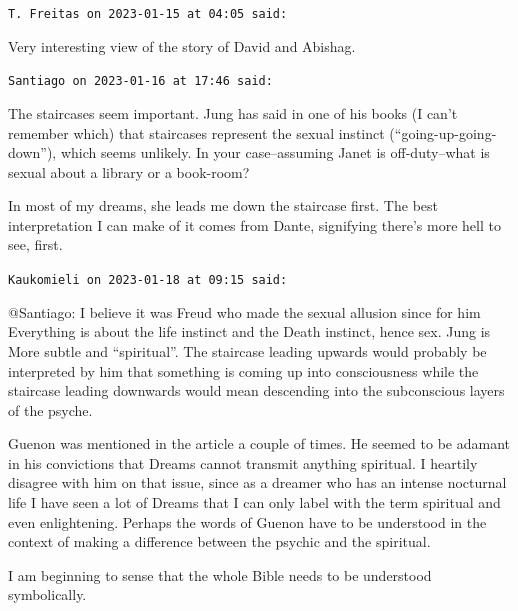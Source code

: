 \begin{footnotesize}
\begin{sffamily}
\texttt{T. Freitas on 2023-01-15 at 04:05 said:}

Very interesting view of the story of David and Abishag.

\hfill

\texttt{Santiago on 2023-01-16 at 17:46 said:}

The staircases seem important. Jung has said in one of his books (I can't remember which) that staircases represent the sexual instinct (``going-up-going-down''), which seems unlikely. In your case--assuming Janet is off-duty--what is sexual about a library or a book-room?

In most of my dreams, she leads me down the staircase first. The best interpretation I can make of it comes from Dante, signifying there's more hell to see, first.

\hfill

\texttt{Kaukomieli on 2023-01-18 at 09:15 said:}

@Santiago: I believe it was Freud who made the sexual allusion since for him Everything is about the life instinct and the Death instinct, hence sex. Jung is More subtle and ``spiritual''. The staircase leading upwards would probably be interpreted by him that something is coming up into consciousness while the staircase leading downwards would mean descending into the subconscious layers of the psyche.

Guenon was mentioned in the article a couple of times. He seemed to be adamant in his convictions that Dreams cannot transmit anything spiritual. I heartily disagree with him on that issue, since as a dreamer who has an intense nocturnal life I have seen a lot of Dreams that I can only label with the term spiritual and even enlightening. Perhaps the words of Guenon have to be understood in the context of making a difference between the psychic and the spiritual.

I am beginning to sense that the whole Bible needs to be understood symbolically.


\hfill

\end{sffamily}
\end{footnotesize}

